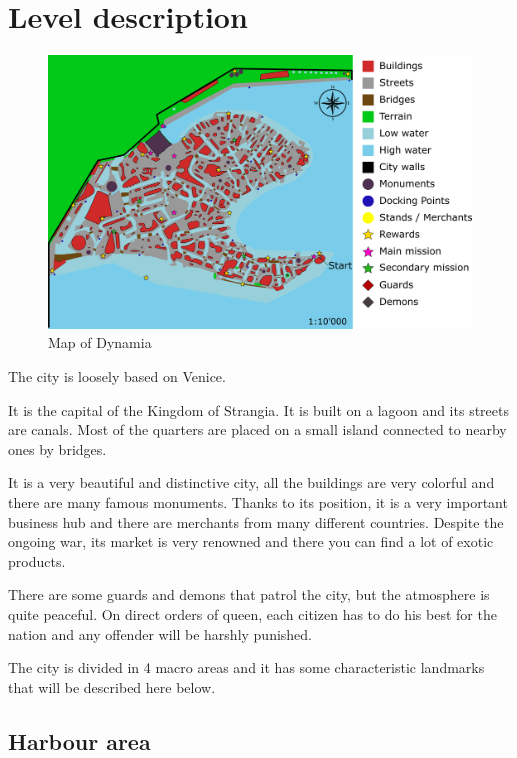 \section{Level description}

\begin{center}
  \begin{figure}[H]
    \centering
    \includegraphics[width=\textwidth]{Images/Maps/dynamia}
    \caption{Map of Dynamia}
  \end{figure}
\end{center}

The city is loosely based on Venice.

It is the capital of the Kingdom of Strangia. It is built on a lagoon and its streets are canals. Most of the quarters are placed on a small island connected to nearby ones by bridges.

It is a very beautiful and distinctive city, all the buildings are very colorful and there are many famous monuments. Thanks to its position, it is a very important business hub and there are merchants from many different countries. Despite the ongoing war, its market is very renowned and there you can find a lot of exotic products.

There are some guards and demons that patrol the city, but the atmosphere is quite peaceful. On direct orders of queen, each citizen has to do his best for the nation and any offender will be harshly punished.

The city is divided in 4 macro areas and it has some characteristic landmarks that will be described here below.
\subsection{Harbour area}
